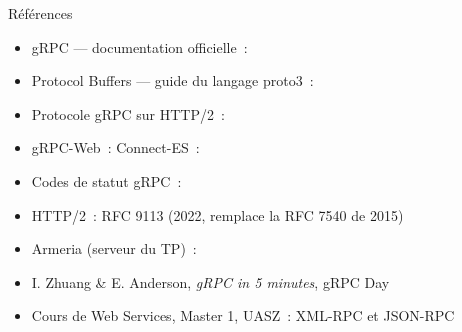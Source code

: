 \documentclass[aspectratio=169,11pt]{beamer}
\begin{document}
\begin{frame}{Références}
  \small
  \begin{itemize}
    \item gRPC — documentation officielle~: 
    \item Protocol Buffers — guide du langage proto3~: 
    \item Protocole gRPC sur HTTP/2~: 
    \item gRPC-Web~:  \enspace\textperiodcentered\enspace Connect-ES~: 
    \item Codes de statut gRPC~: 
    \item HTTP/2~: RFC 9113 (2022, remplace la RFC 7540 de 2015)
    \item Armeria (serveur du TP)~: 
    \item I. Zhuang \& E. Anderson, \emph{gRPC in 5 minutes}, gRPC Day
    \item Cours de Web Services, Master 1, UASZ~: XML-RPC et JSON-RPC
  \end{itemize}
\end{frame}
\end{document}
